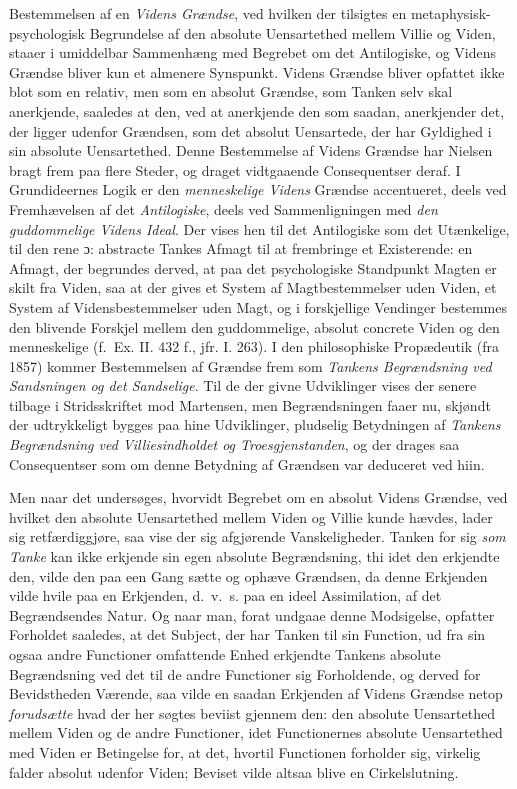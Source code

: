 \documentclass[12pt,a4paper]{book}
\newcommand{\opage}[1]{\marginnote{\footnotesize\textit{[#1]}}}
\begin{document}
Bestemmelsen af en \emph{Videns Grændse}, ved hvilken der tilsigtes en
metaphysisk-psychologisk Begrundelse af den absolute Uensartethed mellem Villie og Viden,
staaer i umiddelbar Sammenhæng med Begrebet om det Antilogiske, og Videns Grændse bliver
kun et almenere Synspunkt. Videns Grændse bliver opfattet ikke blot som en relativ, men som
en absolut Grændse, som Tanken selv skal aner\opage{158}kjende, saaledes at den, ved at anerkjende den
som saadan, anerkjender det, der ligger udenfor Grændsen, som det absolut Uensartede, der
har Gyldighed i sin absolute Uensartethed. Denne Bestemmelse af Videns Grændse har Nielsen
bragt frem paa flere Steder, og draget vidtgaaende Consequentser deraf. I Grundideernes
Logik er den \emph{menneskelige Videns} Grændse accentueret, deels ved Fremhævelsen af det \emph{Antilogiske}, deels ved Sammenligningen med \emph{den guddommelige Videns Ideal}. Der vises
hen til det Antilogiske som det Utænkelige, til den rene ɔ: abstracte Tankes Afmagt til at
frembringe et Existerende: en Afmagt, der begrundes derved, at paa det psychologiske
Standpunkt Magten er skilt fra Viden, saa at der gives et System af Magtbestemmelser uden
Viden, et System af Vidensbestemmelser uden Magt, og i forskjellige Vendinger bestemmes den
blivende Forskjel mellem den guddommelige, absolut concrete Viden og den menneskelige
(f.\ Ex. II. 432 f., jfr. I. 263). I den philosophiske Propædeutik (fra 1857) kommer
Bestemmelsen af Grændse frem som \emph{Tankens Begrændsning ved Sandsningen og det
Sandselige}. Til de der givne Udviklinger vises der senere tilbage i Stridsskriftet mod
Martensen, men Begrændsningen faaer nu, skjøndt der udtrykkeligt bygges paa hine
Udviklinger, pludselig Betydningen af \emph{Tankens Begrændsning ved Villiesindholdet og
Troesgjenstanden}, og der drages saa Consequentser som om denne Betydning af Grændsen var
deduceret ved hiin.

Men naar det undersøges, hvorvidt Begrebet om en absolut Videns Grændse, ved hvilket den
absolute Uensartethed mellem Viden og Villie kunde hævdes, lader sig retfærdiggjøre, saa
vise der sig afgjørende Vanskeligheder. Tanken for sig \emph{som Tanke} kan ikke erkjende sin egen
absolute Begrændsning, thi idet den erkjendte den, vilde den paa een Gang sætte og ophæve
Grændsen, da denne Erkjenden vilde hvile paa en Erkjenden, d.\ v.\ s. paa en ideel
Assimilation, af det Begrændsendes Natur. Og naar man, forat undgaae denne Modsigelse,
opfatter Forholdet saaledes, \opage{159}at det Subject, der har Tanken til sin Function, ud fra sin
ogsaa andre Functioner omfattende Enhed erkjendte Tankens absolute Begrændsning ved det til
de andre Functioner sig Forholdende, og derved for Bevidstheden Værende, saa vilde en
saadan Erkjenden af Videns Grændse netop \emph{forudsætte} hvad der her søgtes beviist gjennem
den: den absolute Uensartethed mellem Viden og de andre Functioner, idet Functionernes
absolute Uensartethed med Viden er Betingelse for, at det, hvortil Functionen forholder
sig, virkelig falder absolut udenfor Viden; Beviset vilde altsaa blive en Cirkelslutning.
\end{document}
